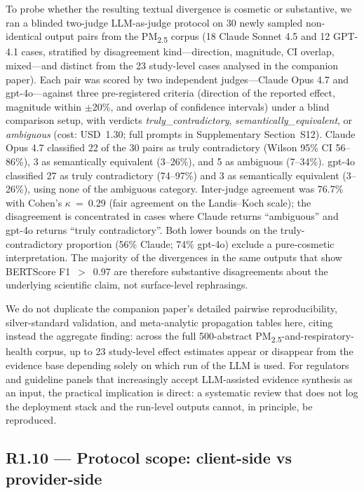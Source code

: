 \documentclass[11pt,a4paper]{article}
\begin{document}
{To probe whether the resulting textual divergence is cosmetic or substantive, we ran a blinded two-judge LLM-as-judge protocol on 30 newly sampled non-identical output pairs from the PM\textsubscript{2.5} corpus (18 Claude Sonnet 4.5 and 12 GPT-4.1 cases, stratified by disagreement kind---direction, magnitude, CI overlap, mixed---and distinct from the 23 study-level cases analysed in the companion paper). Each pair was scored by two independent judges---Claude Opus 4.7 and gpt-4o---against three pre-registered criteria (direction of the reported effect, magnitude within $\pm$20\%, and overlap of confidence intervals) under a blind comparison setup, with verdicts \emph{truly\_contradictory}, \emph{semantically\_equivalent}, or \emph{ambiguous} (cost: USD~1.30; full prompts in Supplementary Section~S12). Claude Opus 4.7 classified 22 of the 30 pairs as truly contradictory (Wilson 95\% CI 56--86\%), 3 as semantically equivalent (3--26\%), and 5 as ambiguous (7--34\%). gpt-4o classified 27 as truly contradictory (74--97\%) and 3 as semantically equivalent (3--26\%), using none of the ambiguous category. Inter-judge agreement was 76.7\% with Cohen's $\kappa$~=~0.29 (fair agreement on the Landis--Koch scale); the disagreement is concentrated in cases where Claude returns ``ambiguous'' and gpt-4o returns ``truly contradictory''. Both lower bounds on the truly-contradictory proportion (56\% Claude; 74\% gpt-4o) exclude a pure-cosmetic interpretation. The majority of the divergences in the same outputs that show BERTScore F1~$>$~0.97 are therefore substantive disagreements about the underlying scientific claim, not surface-level rephrasings.

We do not duplicate the companion paper's detailed pairwise reproducibility, silver-standard validation, and meta-analytic propagation tables here, citing instead the aggregate finding: across the full 500-abstract PM\textsubscript{2.5}-and-respiratory-health corpus, up to 23 study-level effect estimates appear or disappear from the evidence base depending solely on which run of the LLM is used. For regulators and guideline panels that increasingly accept LLM-assisted evidence synthesis as an input, the practical implication is direct: a systematic review that does not log the deployment stack and the run-level outputs cannot, in principle, be reproduced.}

\subsection*{R1.10 --- Protocol scope: client-side vs provider-side}
\end{document}
